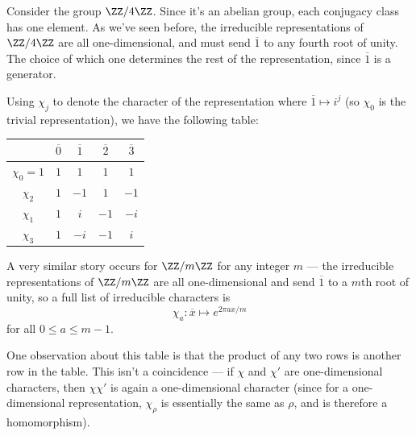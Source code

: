 \begin{example}
Consider the group $\ZZ/4\ZZ$. Since it's an abelian group, each conjugacy class has one element. As we've seen before, the irreducible representations of $\ZZ/4\ZZ$ are all one-dimensional, and must send $\overline{1}$ to any fourth root of unity. The choice of which one determines the rest of the representation, since $\overline{1}$ is a generator. 

Using $\chi_j$ to denote the character of the representation where $\overline{1} \mapsto i^j$ (so $\chi_0$ is the trivial representation), we have the following table:




\begin{center}
    \begin{tabular}{c||c|c|c|c}
        & $\overline{0}$ & $\overline{1}$ & $\overline{2}$ & $\overline{3}$ \\
        \hline
        \hline
        $\chi_0 = 1$ & $1$ & $1$ & $1$ & $1$ \\
        \hline
        $\chi_2$  & $1$ & $-1$ & $1$ & $-1$ \\
        \hline
        $\chi_1$ & $1$ & $i$ & $-1$ & $-i$ \\
        \hline
        $\chi_3$ & $1$ & $-i$ & $-1$ & $i$
    \end{tabular}
\end{center}

A very similar story occurs for $\ZZ/m\ZZ$ for any integer $m$ --- the irreducible representations of $\ZZ/m\ZZ$ are all one-dimensional and send $\overline{1}$ to a $m$th root of unity, so a full list of irreducible characters is \[\chi_a : \overline{x} \mapsto e^{2\pi a x/m}\] for all $0 \leq a \leq m - 1$. 
\end{example}

One observation about this table is that the product of any two rows is another row in the table. This isn't a coincidence --- if $\chi$ and $\chi'$ are one-dimensional characters, then $\chi\chi'$ is again a one-dimensional character (since for a one-dimensional representation, $\chi_\rho$ is essentially the same as $\rho$, and is therefore a homomorphism). 

